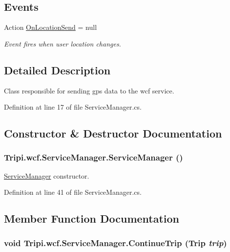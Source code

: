 \subsection*{Events}
\begin{DoxyCompactItemize}
\item 
Action \hyperlink{class_tripi_1_1wcf_1_1_service_manager_a81275d9601585a2a30ccbc7841fad81e}{OnLocationSend} = null
\begin{DoxyCompactList}\small\item\em Event fires when user location changes. \item\end{DoxyCompactList}\end{DoxyCompactItemize}


\subsection{Detailed Description}
Class responsible for sending gps data to the wcf service. 

Definition at line 17 of file ServiceManager.cs.

\subsection{Constructor \& Destructor Documentation}
\hypertarget{class_tripi_1_1wcf_1_1_service_manager_add232278af04b6e75666dbccfa6f067c}{
\subsubsection[{ServiceManager}]{\setlength{\rightskip}{0pt plus 5cm}Tripi.wcf.ServiceManager.ServiceManager ()}}
\label{class_tripi_1_1wcf_1_1_service_manager_add232278af04b6e75666dbccfa6f067c}


\hyperlink{class_tripi_1_1wcf_1_1_service_manager}{ServiceManager} constructor. 

Definition at line 41 of file ServiceManager.cs.

\subsection{Member Function Documentation}
\hypertarget{class_tripi_1_1wcf_1_1_service_manager_a952bc21f58ae1141773be7f75e9d19dd}{
\subsubsection[{ContinueTrip}]{\setlength{\rightskip}{0pt plus 5cm}void Tripi.wcf.ServiceManager.ContinueTrip ({\bf Trip} {\em trip})}}
\label{class_tripi_1_1wcf_1_1_service_manager_a952bc21f58ae1141773be7f75e9d19dd}


